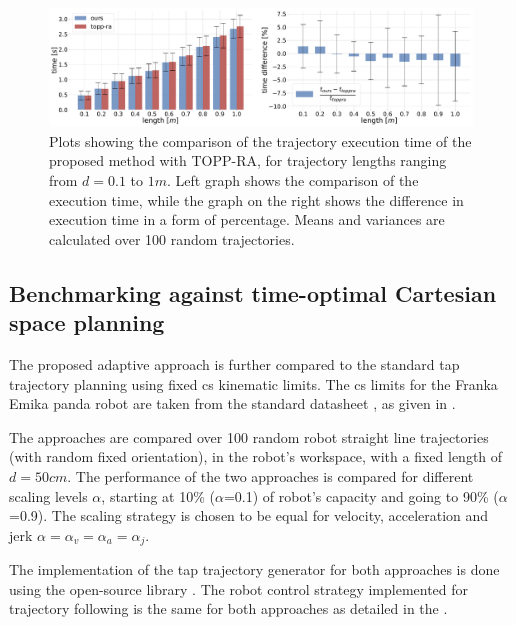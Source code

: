 \begin{figure}[!t]
    \centering
    \includegraphics[width=\linewidth]{Papers/imgs/toppra_ruckig_time_comp.pdf}
    \caption{Plots showing the comparison of the trajectory execution time of the proposed method with TOPP-RA, for trajectory lengths ranging from $d=0.1$ to $1m$. Left graph shows the comparison of the execution time, while the graph on the right shows the difference in execution time in a form of percentage. Means and variances are calculated over 100 random trajectories.}
    \label{fig:comparison_time}
\end{figure}


\subsection{Benchmarking against time-optimal Cartesian space planning}

The proposed adaptive approach is further compared to the standard \gls{tap} trajectory planning using fixed \gls{cs} kinematic limits. The \gls{cs} limits for the Franka Emika panda robot are taken from the standard datasheet \cite{frankadata}, as given in .

The approaches are compared over 100 random robot straight line trajectories (with random fixed orientation), in the robot's workspace, with a fixed length of $d=50cm$. The performance of the two approaches is compared for different scaling levels $\alpha$, starting at 10\% ($\alpha$=0.1) of robot's capacity and going to 90\% ($\alpha$=0.9). The scaling strategy is chosen to be equal for velocity, acceleration and jerk $\alpha\!=\!\alpha_v\!=\!\alpha_a\!=\!\alpha_j$. 

The implementation of the \gls{tap} trajectory generator for both approaches is done using the open-source library  \cite{ruckig}. The robot control strategy implemented for trajectory following is the same for both approaches as detailed in the .

